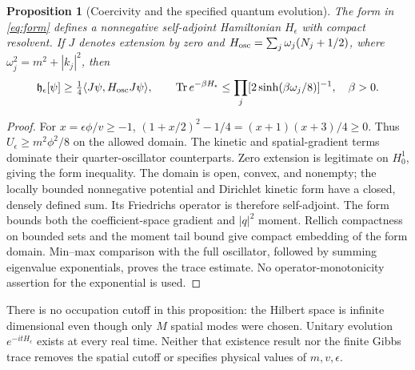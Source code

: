 \documentclass[11pt]{article}
\newtheorem{proposition}[theorem]{Proposition}
\newcommand{\Tr}{\operatorname{Tr}}
\begin{document}
\begin{proposition}[Coercivity and the specified quantum evolution]
\label{prop:radial}
The form in \eqref{eq:form} defines a nonnegative self-adjoint Hamiltonian
$H_\epsilon$ with compact resolvent. If $J$ denotes extension by zero and
$H_{\rm osc}=\sum_j\omega_j(N_j+1/2)$, where
$\omega_j^2=m^2+|k_j|^2$, then
\begin{equation}
 \mathfrak h_\epsilon[\psi]\ge
 \tfrac14\langle J\psi,H_{\rm osc}J\psi\rangle,\qquad
 \Tr e^{-\beta H_\epsilon}\le
 \prod_j[2\sinh(\beta\omega_j/8)]^{-1},\quad\beta>0.
 \label{eq:coercive}
\end{equation}
\end{proposition}
\begin{proof}
For $x=\epsilon\phi/v\ge-1$,
$(1+x/2)^2-1/4=(x+1)(x+3)/4\ge0$. Thus
$U_\epsilon\ge m^2\phi^2/8$ on the allowed domain.
The kinetic and spatial-gradient terms dominate their quarter-oscillator
counterparts. Zero extension is legitimate on $H_0^1$, giving the form
inequality. The domain is open, convex, and nonempty; the locally bounded
nonnegative potential and Dirichlet kinetic form have a closed, densely
defined sum. Its Friedrichs operator is therefore self-adjoint.
The form bounds both the coefficient-space gradient and $|q|^2$ moment.
Rellich compactness on bounded sets and the moment tail bound give compact
embedding of the form domain. Min--max comparison with the full oscillator,
followed by summing eigenvalue exponentials, proves the trace estimate.
No operator-monotonicity assertion for the exponential is used.
\end{proof}

There is no occupation cutoff in this proposition: the Hilbert space is
infinite dimensional even though only $M$ spatial modes were chosen.
Unitary evolution $e^{-itH_\epsilon}$ exists at every real time. Neither
that existence result nor the finite Gibbs trace removes the spatial
cutoff or specifies physical values of $m,v,\epsilon$.
\end{document}
